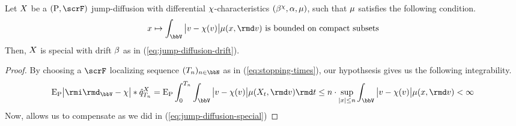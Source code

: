 \begin{lemma}
  \label{lemma:special}
  Let $X$ be a $(\Prb, \scrF)$ jump-diffusion with differential $\chi$-characteristics $(\beta^\chi, \alpha, \mu)$, such that $\mu$ satisfies the following condition.
  \begin{equation*}
    \stateVar \mapsto \int_\vecSpace \big|\markVar - \trunc(\markVar) \big| \affJump(\stateVar, \rmd\markVar) \text{ is bounded on compact subsets}
  \end{equation*}
  Then, $X$ is special with drift $\beta$ as in (\ref{eq:jump-diffusion-drift}).
\end{lemma}
\begin{proof}
  \label{proof:lemma:special}
  By choosing a $\scrF$ localizing sequence $(T_n)_{n\in\bbN}$ as in (\ref{eq:stopping-times}), our hypothsesis gives us the following integrability.
  \begin{equation*}
    \Exp_\Prb\big| \id_\vecSpace- \trunc \big| \ast \predproj{\jumpMeas^\X}_{T_n}
    = \Exp_\Prb \int_0^{T_n} \int_\vecSpace \big|\markVar - \trunc(\markVar)\big| \affJump(\X_t, \rmd\markVar) \rmd t
    \leq n \cdot \sup_{|\stateVar|\leq n} \int_\vecSpace \big|\markVar-\trunc(\markVar)\big| \affJump(\stateVar, \rmd\markVar) < \infty
  \end{equation*}
  Now, \cite[Proposition II.1.28]{jacod2003} allows us to compensate as we did in (\ref{eq:jump-diffusion-special})
\end{proof}
